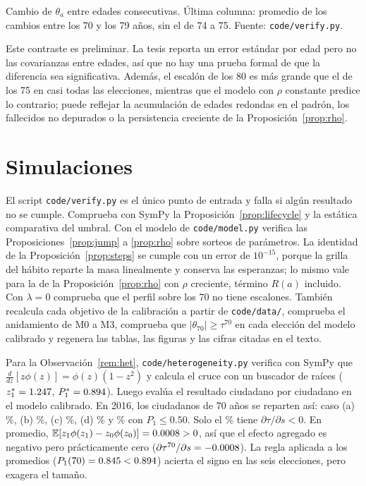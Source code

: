 \documentclass[11pt]{article}
\theoremstyle{definition}
\newcommand{\E}{\mathbb{E}}
\newcommand{\1}{\mathbbm{1}}
\begin{document}
\begin{table}[ht]
  \centering\small
  \caption{Cambio de la participación de un año al siguiente, en puntos (datos de la tesis).}\label{tab:steps}
  \par\smallskip\footnotesize Cambio de $\theta_a$ entre edades consecutivas. Última columna: promedio de los
  cambios entre los 70 y los 79 años, sin el de 74 a 75. Fuente: \texttt{code/verify.py}.
\end{table}

Este contraste es preliminar. La tesis reporta un error estándar por edad pero no las covarianzas
entre edades, así que no hay una prueba formal de que la diferencia sea significativa. Además, el
escalón de los 80 es más grande que el de los 75 en casi todas las elecciones, mientras que el modelo
con $\rho$ constante predice lo contrario; puede reflejar la acumulación de edades redondas en el
padrón, los fallecidos no depurados o la persistencia creciente de la Proposición~\ref{prop:rho}.

\section{Simulaciones}\label{sec:sim}

El script \texttt{code/verify.py} es el único punto de entrada y falla si algún resultado no se
cumple. Comprueba con SymPy la Proposición~\ref{prop:lifecycle} y la estática comparativa del
umbral. Con el modelo de \texttt{code/model.py} verifica las Proposiciones~\ref{prop:jump} a
\ref{prop:rho} sobre sorteos de parámetros. La identidad de la Proposición~\ref{prop:steps} se cumple
con un error de $10^{-15}$, porque la grilla del hábito reparte la masa linealmente y conserva las
esperanzas; lo mismo vale para la de la Proposición~\ref{prop:rho} con $\rho$ creciente, término
$R(a)$ incluido. Con $\lambda=0$ comprueba que el perfil sobre los 70 no tiene escalones. También
recalcula cada objetivo de la calibración a partir de \texttt{code/data/}, comprueba el anidamiento
de M0 a M3, comprueba que $|\theta_{70}|\ge\tau^{70}$ en cada elección del modelo calibrado y
regenera las tablas, las figuras y las cifras citadas en el texto.

Para la Observación~\ref{rem:het}, \texttt{code/heterogeneity.py} verifica con SymPy que
$\frac{d}{dz}[z\phi(z)]=\phi(z)(1-z^2)$ y calcula el cruce con un buscador de raíces
($z_1^*=1.247$, $P_1^*=0.894$). Luego evalúa el resultado ciudadano por ciudadano en el modelo
calibrado. En 2016, los ciudadanos de 70 años se reparten así: caso (a) \hetRunCaseA\%, (b)
\hetRunCaseB\%, (c) \hetRunCaseC\%, (d) \hetRunCaseD\% y \hetRunCaseO\% con $P_1\le0.50$. Solo el
\hetRunNeg\% tiene $\partial\tau/\partial s<0$. En promedio,
$\E[z_1\phi(z_1)-z_0\phi(z_0)]=\hetRunE>0$, así que el efecto agregado es negativo pero
prácticamente cero ($\partial\tau^{70}/\partial s=-0.0008$). La regla aplicada a los promedios
($P_1(70)=0.845<0.894$) acierta el signo en las seis elecciones, pero exagera el tamaño.
\end{document}

